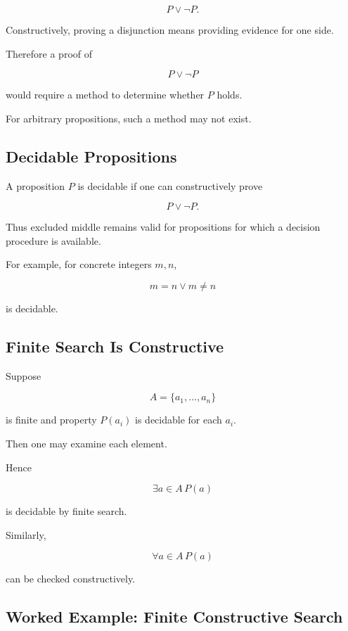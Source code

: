 \[
\boxed{
P\lor\neg P.
}
\]

Constructively, proving a disjunction means providing evidence for one side.

Therefore a proof of

\[
P\lor\neg P
\]

would require a method to determine whether \(P\) holds.

For arbitrary propositions, such a method may not exist.

\subsection{Decidable Propositions}
\label{subsec:decidable-propositions}

A proposition \(P\) is decidable if one can constructively prove

\[
\boxed{
P\lor\neg P.
}
\]

Thus excluded middle remains valid for propositions for which a decision
procedure is available.

For example, for concrete integers \(m,n\),

\[
\boxed{
m=n
\lor
m\neq n
}
\]

is decidable.

\subsection{Finite Search Is Constructive}
\label{subsec:finite-search-constructive}

Suppose

\[
A=\{a_1,\ldots,a_n\}
\]

is finite and property \(P(a_i)\) is decidable for each \(a_i\).

Then one may examine each element.

Hence

\[
\boxed{
\exists a\in A\,P(a)
}
\]

is decidable by finite search.

Similarly,

\[
\boxed{
\forall a\in A\,P(a)
}
\]

can be checked constructively.

\subsection{Worked Example: Finite Constructive Search}
\label{subsec:worked-finite-constructive-search}

